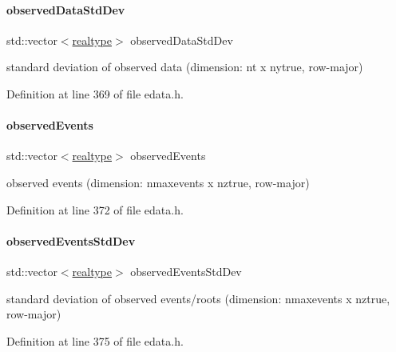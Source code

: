 \paragraph{\texorpdfstring{observed\+Data\+Std\+Dev}{observedDataStdDev}}
{\footnotesize\ttfamily std\+::vector$<$\mbox{\hyperlink{namespaceamici_a1bdce28051d6a53868f7ccbf5f2c14a3}{realtype}}$>$ observed\+Data\+Std\+Dev\hspace{0.3cm}{\ttfamily [protected]}}

standard deviation of observed data (dimension\+: nt x nytrue, row-\/major) 

Definition at line 369 of file edata.\+h.

\mbox{\label{classamici_1_1_exp_data_a629e6085839e16bac95ef0eba580f7f0}} 
\paragraph{\texorpdfstring{observed\+Events}{observedEvents}}
{\footnotesize\ttfamily std\+::vector$<$\mbox{\hyperlink{namespaceamici_a1bdce28051d6a53868f7ccbf5f2c14a3}{realtype}}$>$ observed\+Events\hspace{0.3cm}{\ttfamily [protected]}}

observed events (dimension\+: nmaxevents x nztrue, row-\/major) 

Definition at line 372 of file edata.\+h.

\mbox{\label{classamici_1_1_exp_data_abb12a8f75b4e6c936ae6c0be770628c9}} 
\paragraph{\texorpdfstring{observed\+Events\+Std\+Dev}{observedEventsStdDev}}
{\footnotesize\ttfamily std\+::vector$<$\mbox{\hyperlink{namespaceamici_a1bdce28051d6a53868f7ccbf5f2c14a3}{realtype}}$>$ observed\+Events\+Std\+Dev\hspace{0.3cm}{\ttfamily [protected]}}

standard deviation of observed events/roots (dimension\+: nmaxevents x nztrue, row-\/major) 

Definition at line 375 of file edata.\+h.

